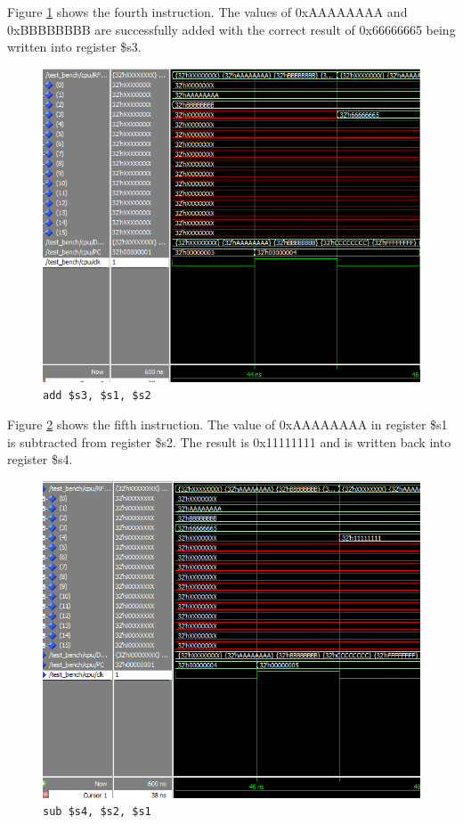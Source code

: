 \documentclass[12pt]{article}
\begin{document}
Figure \ref{fig:4-instr} shows the fourth instruction. The values of 0xAAAAAAAA and 0xBBBBBBBB are successfully added with the correct result of 0x66666665 being written into register \$s3.

\begin{figure}[H]
\centering
\includegraphics[width=\linewidth]{simulation/4-instr}
\caption{\texttt{add \$s3, \$s1, \$s2}}
\label{fig:4-instr}
\end{figure}

Figure \ref{fig:5-instr} shows the fifth instruction. The value of 0xAAAAAAAA in register \$s1 is subtracted from register \$s2. The result is 0x11111111 and is written back into register \$s4.
\begin{figure}[H]
\centering
\includegraphics[width=\linewidth]{simulation/5-instr}
\caption{\texttt{sub \$s4, \$s2, \$s1}}
\label{fig:5-instr}
\end{figure}
\end{document}
